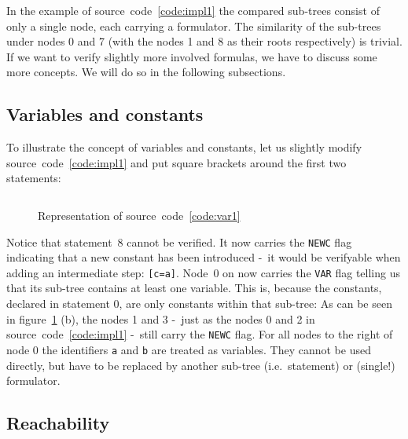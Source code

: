 \documentclass[british]{article}
\newenvironment{code}{\captionsetup{type=listing}}{}
\newcommand\prv{bc}
\newcommand\m[1]{\texttt{#1}}
\begin{document}
In the example of source~code~\ref{code:impl1} the compared sub-trees consist of
only a single node, each carrying a formulator. The similarity of the sub-trees
under nodes 0 and 7 (with the nodes 1 and 8 as their roots respectively) is
trivial. If we want to verify slightly more involved formulas, we have to
discuss some more concepts. We will do so in the following subsections.

\pagebreak{}

\subsection{Variables and constants}\label{sec:var}

To illustrate the concept of variables and constants, let us slightly modify
source~code~\ref{code:impl1} and put square brackets around the first two
statements:

\begin{code}
\label{code:var1}
\inputminted[linenos]{\prv}{examples/var1.prove}
\end{code}

\begin{figure}[!h]
\caption{Representation of source~code~\ref{code:var1}}\label{fig:var1}
\centering
{}
\end{figure}

Notice that statement~8 cannot be verified. It now carries the \texttt{NEWC}
flag indicating that a new constant has been introduced -\ it would be
verifyable when adding an intermediate step: \m{[c=a]}. Node~0 on now carries
the \texttt{VAR} flag telling us that its sub-tree contains at least one
variable.  This is, because the constants, declared in statement 0, are only
constants within that sub-tree: As can be seen in figure~\ref{fig:var1} (b), the
nodes 1 and 3 -\ just as the nodes 0 and 2 in source~code~\ref{code:impl1} -\
still carry the \texttt{NEWC} flag.  For all nodes to the right of node 0 the
identifiers \m{a} and \m{b} are treated as variables. They cannot be used
directly, but have to be replaced by another sub-tree (i.e.\ statement) or
(single!) formulator.

\pagebreak{}

\subsection{Reachability}\label{sec:reach}
\end{document}
